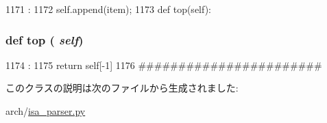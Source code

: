 \begin{DoxyCode}
1171                         :
1172         self.append(item);
1173 
    def top(self):
\end{DoxyCode}
\hypertarget{classisa__parser_1_1Stack_a9ef5200066c676a2904e5745f8e00179}{
\subsubsection[{top}]{\setlength{\rightskip}{0pt plus 5cm}def top ( {\em self})}}
\label{classisa__parser_1_1Stack_a9ef5200066c676a2904e5745f8e00179}



\begin{DoxyCode}
1174                  :
1175         return self[-1]
1176 
#######################
\end{DoxyCode}


このクラスの説明は次のファイルから生成されました:\begin{DoxyCompactItemize}
\item 
arch/\hyperlink{isa__parser_8py}{isa\_\-parser.py}\end{DoxyCompactItemize}
